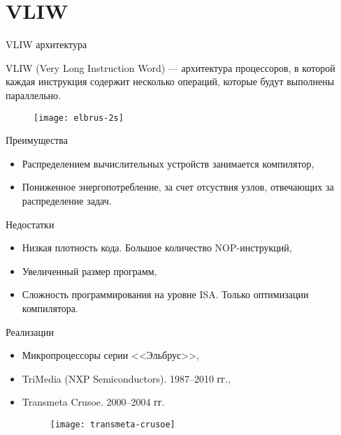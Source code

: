 \section{VLIW}

\begin{frame}{VLIW архитектура}

VLIW (Very Long Instruction Word) --- архитектура процессоров, в которой каждая
инструкция содержит несколько операций, которые будут выполнены параллельно.

\begin{figure}[htpb]
    \texttt{[image: elbrus-2s]}
\end{figure}

\end{frame}

\begin{frame}{Преимущества}
\begin{itemize}
    \item Распределением вычислительных устройств занимается компилятор,
    \item Пониженное энергопотребление, за счет отсуствия узлов, отвечающих за
    распределение задач.
\end{itemize}
\end{frame}

\begin{frame}{Недостатки}
\begin{itemize}
    \item Низкая плотность кода. Большое количество NOP-инструкций,
    \item Увеличенный размер программ,
    \item Сложность программирования на уровне ISA. Только оптимизации
    компилятора.
\end{itemize}
\end{frame}

\begin{frame}{Реализации}
\begin{itemize}
    \item Микропроцессоры серии <<Эльбрус>>,
    \item TriMedia (NXP Semiconductors). 1987--2010 гг.,
    \item Transmeta Crusoe. 2000--2004 гг.
    \begin{figure}[htbp]
        \texttt{[image: transmeta-crusoe]}
    \end{figure}
\end{itemize}
\end{frame}

